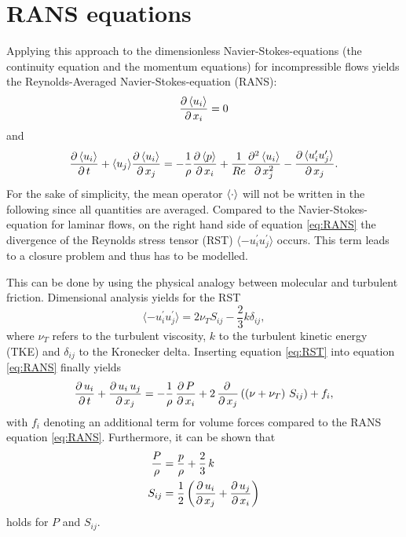 \section{RANS equations} %
\label{sec:rans_equations}
Applying this approach to the dimensionless Navier-Stokes-equations (the continuity equation and the momentum equations) for incompressible flows yields the Reynolds-Averaged Navier-Stokes-equation (RANS):
\begin{equation}\label{eq:conti}
	\frac{\partial\,\langle u_i \rangle}{\partial\,x_i} = 0
\end{equation}
and
\begin{equation}
	\label{eq:RANS}
	\frac{\partial\,\langle u_i \rangle}{\partial\,t} + \langle u_j \rangle \frac{\partial\,\langle u_i \rangle}{\partial\,x_j} = -\frac{1}{\rho} \frac{\partial\,\langle p \rangle}{\partial\,x_i}+\frac{1}{Re} \frac{\partial^2\,\langle u_i \rangle}{\partial\,x_j^2}-\frac{\partial\,\langle u_i^{\prime}u_j^{\prime} \rangle}{\partial\,x_j}.
\end{equation}
For the sake of simplicity, the mean operator $\left\langle \cdot \right\rangle$ will not be written in the following since all quantities are averaged. Compared to the Navier-Stokes-equation for laminar flows, on the right hand side of equation \eqref{eq:RANS} the divergence of the Reynolds stress tensor (RST) $\langle -u_i^{\prime}u_j^{\prime} \rangle$ occurs. This term leads to a closure problem and thus has to be modelled.

\noii This can be done by using the physical analogy between molecular and turbulent friction. Dimensional analysis yields for the RST
\begin{equation}
	\label{eq:RST}
	\langle -u_i^{\prime}u_j^{\prime} \rangle = 2\nu_T S_{ij} - \frac{2}{3} k \delta_{ij},
\end{equation}
where $\nu_T$ refers to the turbulent viscosity, $k$ to the turbulent kinetic energy (TKE) and $\delta_{ij}$ to the Kronecker delta.
Inserting equation \eqref{eq:RST} into equation \eqref{eq:RANS} finally yields
\begin{equation}
	\label{eq:RANSmodified}
	\frac{\partial\,u_i}{\partial\,t}+\frac{\partial\,u_i\,u_j}{\partial\,x_j}=-\frac{1}{\rho}\,\frac{\partial\,P}{\partial\,x_i}+2\,\frac{\partial\,}{\partial\,x_j}\left( \left(\nu+\nu_T\right)\,S_{ij} \right)+f_i,
\end{equation}
with $f_i$ denoting an additional term for volume forces compared to the RANS equation \eqref{eq:RANS}. Furthermore, it can be shown that
\begin{equation}
	\begin{split}
		\frac{P}{\rho} &= \frac{p}{\rho}+\frac{2}{3}\,k \\
		S_{ij}         &= \frac{1}{2}\left(\frac{\partial\,u_i}{\partial\,x_j}+\frac{\partial\,u_j}{\partial\,x_i}\right)
	\end{split}
\end{equation}
holds for $P$ and $S_{ij}$. 

